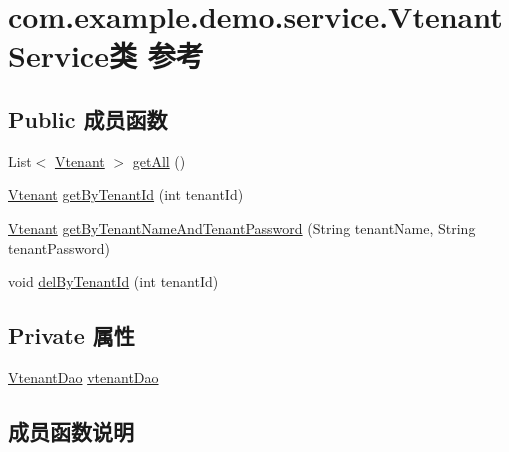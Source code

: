 \hypertarget{classcom_1_1example_1_1demo_1_1service_1_1_vtenant_service}{}\section{com.\+example.\+demo.\+service.\+Vtenant\+Service类 参考}
\label{classcom_1_1example_1_1demo_1_1service_1_1_vtenant_service}
\subsection*{Public 成员函数}
\begin{DoxyCompactItemize}
\item 
List$<$ \mbox{\hyperlink{classcom_1_1example_1_1demo_1_1modular_1_1_vtenant}{Vtenant}} $>$ \mbox{\hyperlink{classcom_1_1example_1_1demo_1_1service_1_1_vtenant_service_a66d280736b4b829847d3dc5e4f5d1ebe}{get\+All}} ()
\item 
\mbox{\hyperlink{classcom_1_1example_1_1demo_1_1modular_1_1_vtenant}{Vtenant}} \mbox{\hyperlink{classcom_1_1example_1_1demo_1_1service_1_1_vtenant_service_a3e7690a692bb79ca19080f7b75e63a7f}{get\+By\+Tenant\+Id}} (int tenant\+Id)
\item 
\mbox{\hyperlink{classcom_1_1example_1_1demo_1_1modular_1_1_vtenant}{Vtenant}} \mbox{\hyperlink{classcom_1_1example_1_1demo_1_1service_1_1_vtenant_service_a7cb3a13e4defd2c1424fc2da04d286f3}{get\+By\+Tenant\+Name\+And\+Tenant\+Password}} (String tenant\+Name, String tenant\+Password)
\item 
void \mbox{\hyperlink{classcom_1_1example_1_1demo_1_1service_1_1_vtenant_service_a69f361e6833a28efd60b3fd977dd155a}{del\+By\+Tenant\+Id}} (int tenant\+Id)
\end{DoxyCompactItemize}
\subsection*{Private 属性}
\begin{DoxyCompactItemize}
\item 
\mbox{\hyperlink{interfacecom_1_1example_1_1demo_1_1dao_1_1_vtenant_dao}{Vtenant\+Dao}} \mbox{\hyperlink{classcom_1_1example_1_1demo_1_1service_1_1_vtenant_service_a03d28b104eafed9cc3ba47f2a0d17700}{vtenant\+Dao}}
\end{DoxyCompactItemize}


\subsection{成员函数说明}
\mbox{\label{classcom_1_1example_1_1demo_1_1service_1_1_vtenant_service_a69f361e6833a28efd60b3fd977dd155a}} 
